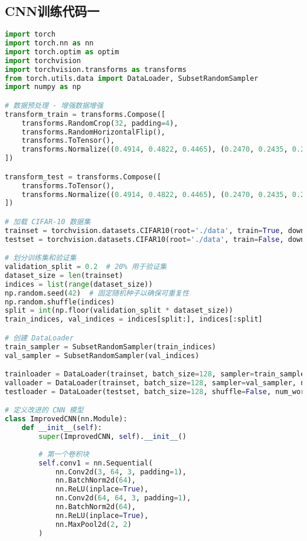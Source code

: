\documentclass[UTF8]{report}
\theoremstyle{MyLineTheoremStyle} %
\theoremstyle{MyBlockTheoremStyle} %
\theoremstyle{MySubsubsectionStyle} %
\begin{document}
\subsection{CNN训练代码一}
\begin{lstlisting}[language=python, caption={神经网络CNN训练（纯手写第一版）}, label={lst:cnn_train_handwritten}]
import torch
import torch.nn as nn
import torch.optim as optim
import torchvision
import torchvision.transforms as transforms
from torch.utils.data import DataLoader, SubsetRandomSampler
import numpy as np

# 数据预处理 - 增强数据增强
transform_train = transforms.Compose([
    transforms.RandomCrop(32, padding=4),
    transforms.RandomHorizontalFlip(),
    transforms.ToTensor(),
    transforms.Normalize((0.4914, 0.4822, 0.4465), (0.2470, 0.2435, 0.2616))
])

transform_test = transforms.Compose([
    transforms.ToTensor(),
    transforms.Normalize((0.4914, 0.4822, 0.4465), (0.2470, 0.2435, 0.2616))
])

# 加载 CIFAR-10 数据集
trainset = torchvision.datasets.CIFAR10(root='./data', train=True, download=True, transform=transform_train)
testset = torchvision.datasets.CIFAR10(root='./data', train=False, download=True, transform=transform_test)

# 划分训练集和验证集
validation_split = 0.2  # 20% 用于验证集
dataset_size = len(trainset)
indices = list(range(dataset_size))
np.random.seed(42)  # 固定随机种子以确保可重复性
np.random.shuffle(indices)
split = int(np.floor(validation_split * dataset_size))
train_indices, val_indices = indices[split:], indices[:split]

# 创建 DataLoader
train_sampler = SubsetRandomSampler(train_indices)
val_sampler = SubsetRandomSampler(val_indices)

trainloader = DataLoader(trainset, batch_size=128, sampler=train_sampler, num_workers=2)
valloader = DataLoader(trainset, batch_size=128, sampler=val_sampler, num_workers=2)
testloader = DataLoader(testset, batch_size=128, shuffle=False, num_workers=2)

# 定义改进的 CNN 模型
class ImprovedCNN(nn.Module):
    def __init__(self):
        super(ImprovedCNN, self).__init__()
        
        # 第一个卷积块
        self.conv1 = nn.Sequential(
            nn.Conv2d(3, 64, 3, padding=1),
            nn.BatchNorm2d(64),
            nn.ReLU(inplace=True),
            nn.Conv2d(64, 64, 3, padding=1),
            nn.BatchNorm2d(64),
            nn.ReLU(inplace=True),
            nn.MaxPool2d(2, 2)
        )
        

\end{lstlisting}
\end{document}
